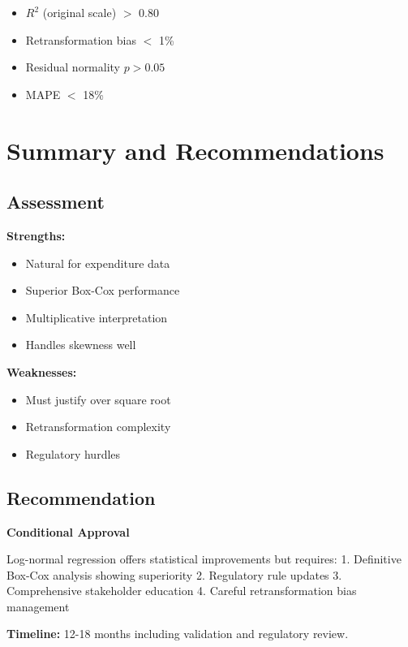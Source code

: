 \begin{itemize}
    \item $R^2$ (original scale) $>$ 0.80
    \item Retransformation bias $<$ 1\%
    \item Residual normality $p > 0.05$
    \item MAPE $<$ 18\%
\end{itemize}

\section{Summary and Recommendations}

\subsection{Assessment}

\textbf{Strengths:}
\begin{itemize}
    \item Natural for expenditure data
    \item Superior Box-Cox performance
    \item Multiplicative interpretation
    \item Handles skewness well
\end{itemize}

\textbf{Weaknesses:}
\begin{itemize}
    \item Must justify over square root
    \item Retransformation complexity
    \item Regulatory hurdles
\end{itemize}

\subsection{Recommendation}

\textbf{Conditional Approval}

Log-normal regression offers statistical improvements but requires:
1. Definitive Box-Cox analysis showing superiority
2. Regulatory rule updates
3. Comprehensive stakeholder education
4. Careful retransformation bias management

\textbf{Timeline:} 12-18 months including validation and regulatory review.
